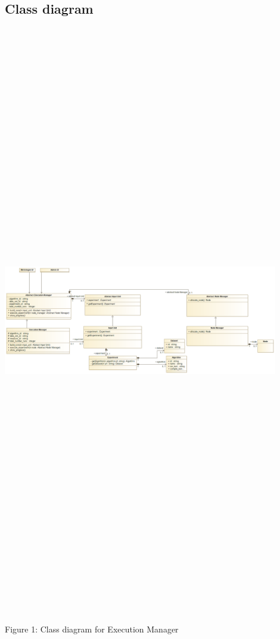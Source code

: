 \subsection{Class diagram}
 \includegraphics[width=12cm,height=26cm,keepaspectratio]{execution_manager/images/execution_manager_class_diagram.png}
	\begin{center}
	    \small{Figure 1: Class diagram for Execution Manager}
    \end{center}
    
